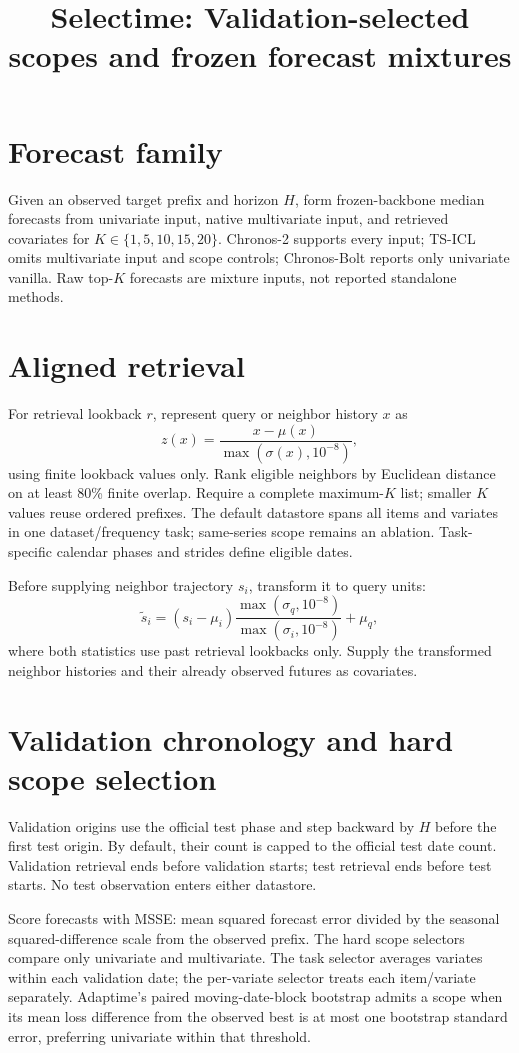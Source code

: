 \documentclass[10pt]{article}
\title{Selectime: Validation-selected scopes and frozen forecast mixtures}
\author{}
\date{}
\begin{document}
\maketitle

\section{Forecast family}
Given an observed target prefix and horizon $H$, form frozen-backbone median
forecasts from univariate input, native multivariate input, and retrieved
covariates for $K\in\{1,5,10,15,20\}$. Chronos-2 supports every input;
TS-ICL omits multivariate input and scope controls; Chronos-Bolt reports only
univariate vanilla. Raw top-$K$ forecasts are mixture inputs, not reported
standalone methods.

\section{Aligned retrieval}
For retrieval lookback $r$, represent query or neighbor history $x$ as
\[
z(x)=\frac{x-\mu(x)}{\max(\sigma(x),10^{-8})},
\]
using finite lookback values only. Rank eligible neighbors by Euclidean
distance on at least 80\% finite overlap. Require a complete maximum-$K$ list;
smaller $K$ values reuse ordered prefixes. The default datastore spans all
items and variates in one dataset/frequency task; same-series scope remains an
ablation. Task-specific calendar phases and strides define eligible dates.

Before supplying neighbor trajectory $s_i$, transform it to query units:
\[
\widetilde s_i=(s_i-\mu_i)
\frac{\max(\sigma_q,10^{-8})}{\max(\sigma_i,10^{-8})}+\mu_q,
\]
where both statistics use past retrieval lookbacks only. Supply the transformed
neighbor histories and their already observed futures as covariates.

\section{Validation chronology and hard scope selection}
Validation origins use the official test phase and step backward by $H$ before
the first test origin. By default, their count is capped to the official test
date count. Validation retrieval ends before validation starts; test retrieval
ends before test starts. No test observation enters either datastore.

Score forecasts with MSSE: mean squared forecast error divided by the seasonal
squared-difference scale from the observed prefix. The hard scope selectors
compare only univariate and multivariate. The task selector averages variates
within each validation date; the per-variate selector treats each item/variate
separately. Adaptime's paired moving-date-block bootstrap admits a scope when
its mean loss difference from the observed best is at most one bootstrap
standard error, preferring univariate within that threshold.
\end{document}
